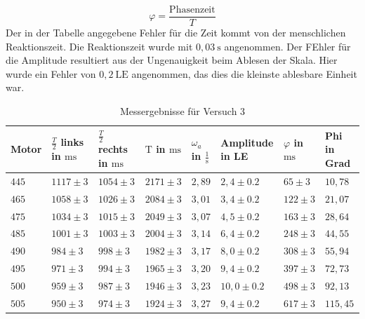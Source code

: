            \begin{equation}
                \varphi = \frac{\text{Phasenzeit}}{T}
            \end{equation}
            Der in der Tabelle angegebene Fehler für die Zeit kommt von der menschlichen Reaktionszeit. Die Reaktionszeit wurde mit $0,03\ \mathrm{s}$ angenommen. Der FEhler für die Amplitude resultiert aus der Ungenauigkeit beim Ablesen der Skala. Hier wurde ein Fehler von $0,2\ \mathrm{LE}$ angenommen, das dies die kleinste ablesbare Einheit war.
            \begin{table}[H]
                \centering
                \caption{Messergebnisse für Versuch 3}
                \vspace{0.5em}
                \begin{tabular}{|l|l|l|l|l|l|l|l|}
                    \hline
                    Motor & $\frac{T}{2}$ links in $\mathrm{ms}$ & $\frac{T}{2}$ rechts in $\mathrm{ms}$ & $\mathrm{T}$ in $\mathrm{ms}$ & $\omega_{a}$ in $\frac{1}{\mathrm{s}}$ & Amplitude in LE& $\varphi$ in $\mathrm{ms}$ & Phi in Grad\\
                    \hline
                    \hline
                    $445$ & $1117 \pm 3$ & $1054 \pm 3$ & $2171 \pm 3$ & $2,89$ & $2,4 \pm 0.2$ & $65 \pm 3$ & $10,78$\\
                    \hline
                    $465$ & $1058 \pm 3$ & $1026 \pm 3$ & $2084 \pm 3$ & $3,01$ & $3,4 \pm 0.2$ & $122 \pm 3$ & $21,07$\\
                    \hline
                    $475$ & $1034 \pm 3$ & $1015 \pm 3$ & $2049 \pm 3$ & $3,07$ & $4,5 \pm 0.2$ & $163 \pm 3$ & $28,64$\\
                    \hline
                    $485$ & $1001 \pm 3$ & $1003 \pm 3$ & $2004 \pm 3$ & $3,14$ & $6,4 \pm 0.2$ & $248 \pm 3$ & $44,55$\\
                    \hline
                    $490$ & $984 \pm 3$ & $998 \pm 3$ & $1982 \pm 3$ & $3,17$ & $8,0 \pm 0.2$ & $308 \pm 3$ & $55,94$\\
                    \hline
                    $495$ & $971 \pm 3$ & $994 \pm 3$ & $1965 \pm 3$ & $3,20$ & $9,4 \pm 0.2$ & $397 \pm 3$ & $72,73$\\
                    \hline
                    $500$ & $959 \pm 3$ & $987 \pm 3$ & $1946 \pm 3$ & $3,23$ & $10,0 \pm 0.2$ & $498 \pm 3$ & $92,13$\\
                    \hline
                    $505$ & $950 \pm 3$ & $974 \pm 3$ & $1924 \pm 3$ & $3,27$ & $9,4 \pm 0.2$ & $617 \pm 3$ & $115,45$\\

\end{tabular}
\end{table}
